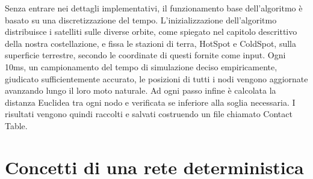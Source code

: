 \documentclass[12pt,a4paper,oneside]{book}
\begin{document}
		Senza entrare nei dettagli implementativi, il funzionamento base dell'algoritmo è basato su una discretizzazione del tempo. L'inizializzazione dell'algoritmo distribuisce i satelliti sulle diverse orbite, come spiegato nel capitolo descrittivo della nostra costellazione, e fissa le stazioni di terra, HotSpot e ColdSpot, sulla superficie terrestre, secondo le coordinate di questi fornite come input. Ogni 10ms, un campionamento del tempo di simulazione deciso empiricamente, giudicato sufficientemente accurato, le posizioni di tutti i nodi vengono aggiornate avanzando lungo il loro moto naturale. Ad ogni passo infine è calcolata la distanza Euclidea tra ogni nodo e verificata se inferiore alla soglia necessaria. I risultati vengono quindi raccolti e salvati costruendo un file chiamato Contact Table.
		
		
		
		

		\section{Concetti di una rete deterministica} \label{concDet}
\end{document}
